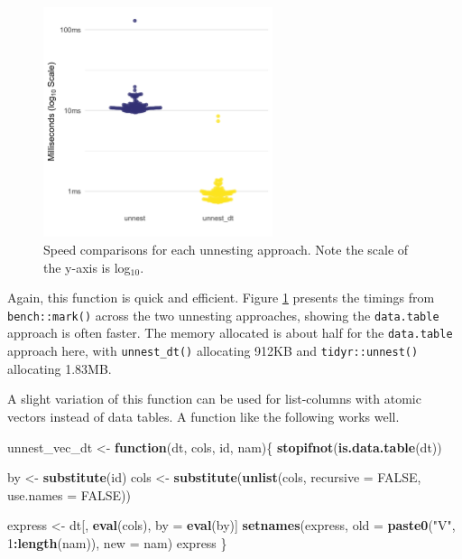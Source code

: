 \documentclass[doc,floatsintext]{apa6}
\newenvironment{Shaded}{\begin{snugshade}}{\end{snugshade}}
\newcommand{\ControlFlowTok}[1]{\textcolor[rgb]{0.13,0.29,0.53}{\textbf{#1}}}
\newcommand{\DataTypeTok}[1]{\textcolor[rgb]{0.13,0.29,0.53}{#1}}
\newcommand{\DecValTok}[1]{\textcolor[rgb]{0.00,0.00,0.81}{#1}}
\newcommand{\KeywordTok}[1]{\textcolor[rgb]{0.13,0.29,0.53}{\textbf{#1}}}
\newcommand{\NormalTok}[1]{#1}
\newcommand{\OperatorTok}[1]{\textcolor[rgb]{0.81,0.36,0.00}{\textbf{#1}}}
\newcommand{\OtherTok}[1]{\textcolor[rgb]{0.56,0.35,0.01}{#1}}
\newcommand{\StringTok}[1]{\textcolor[rgb]{0.31,0.60,0.02}{#1}}
\begin{document}
\begin{figure}[tb]
  \centering
  \includegraphics[width=0.6\textwidth]{timings_unnest_manuscript.png}
  \caption{Speed comparisons for each unnesting approach. Note the scale of the y-axis is log$_{10}$.}
  \label{speed2}
\end{figure}

Again, this function is quick and efficient. Figure \ref{speed2} presents the timings from \texttt{bench::mark()} across the two unnesting approaches, showing the \texttt{data.table} approach is often faster. The memory allocated is about half for the \texttt{data.table} approach here, with \texttt{unnest\_dt()} allocating 912KB and \texttt{tidyr::unnest()} allocating 1.83MB.

A slight variation of this function can be used for list-columns with atomic vectors instead of data tables. A function like the following works well.

\begin{Shaded}
\begin{Highlighting}[]
\NormalTok{unnest_vec_dt <-}\StringTok{ }\ControlFlowTok{function}\NormalTok{(dt, cols, id, nam)\{}
  \KeywordTok{stopifnot}\NormalTok{(}\KeywordTok{is.data.table}\NormalTok{(dt))}
  
\NormalTok{  by <-}\StringTok{ }\KeywordTok{substitute}\NormalTok{(id)}
\NormalTok{  cols <-}\StringTok{ }\KeywordTok{substitute}\NormalTok{(}\KeywordTok{unlist}\NormalTok{(cols, }\DataTypeTok{recursive =} \OtherTok{FALSE}\NormalTok{, }\DataTypeTok{use.names =} \OtherTok{FALSE}\NormalTok{))}
  
\NormalTok{  express <-}\StringTok{ }\NormalTok{dt[, }\KeywordTok{eval}\NormalTok{(cols), by =}\StringTok{ }\KeywordTok{eval}\NormalTok{(by)]}
  \KeywordTok{setnames}\NormalTok{(express, }\DataTypeTok{old =} \KeywordTok{paste0}\NormalTok{(}\StringTok{"V"}\NormalTok{, }\DecValTok{1}\OperatorTok{:}\KeywordTok{length}\NormalTok{(nam)), }\DataTypeTok{new =}\NormalTok{ nam)}
\NormalTok{  express}
\NormalTok{\}}
\end{Highlighting}
\end{Shaded}
\end{document}
